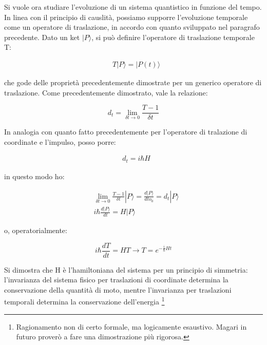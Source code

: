 \documentclass{article}
\begin{document}
Si vuole ora studiare l'evoluzione di un sistema quantistico in funzione del tempo.
In linea con il principio di causlità, possiamo supporre l'evoluzione temporale come un operatore di traslazione, in accordo con quanto sviluppato
nel paragrafo precedente.
Dato un  ket $|P\rangle $, si può definire l'operatore di traslazione temporale T:

\begin{equation}
  \begin{aligned}
     & T |P\rangle = |P(t)\rangle
  \end{aligned}
\end{equation}

che gode delle proprietà precedentemente dimostrate per un generico operatore di traslazione.
Come precedentemente dimostrato, vale la relazione:

\begin{equation}
  d_t= \lim_{\delta t \rightarrow 0} \frac{T-1}{\delta t}
\end{equation}

In analogia con quanto fatto precedentemente per l'operatore di tralazione di coordinate e l'impulso, posso porre:

\begin{equation}
  \begin{aligned}
     & d_t= i\hbar H
  \end{aligned}
\end{equation}

in questo modo ho:

\begin{equation}
  \begin{aligned}
     & \lim_{\delta t \rightarrow 0} \frac{T-1}{\delta t}|P\rangle = \frac{d |P\rangle }{d to_0}= d_t |P\rangle \\
     & i\hbar \frac{d |P\rangle }{dt}= H|P\rangle
  \end{aligned}
\end{equation}

o, operatorialmente:

\begin{equation}
  i\hbar \frac{d T}{dt}= HT \rightarrow T=e^{-\frac{i}{\hbar}Ht}
\end{equation}

Si dimostra che H è l'hamiltoniana del sistema per un principio di simmetria:
l'invarianza del sistema fisico per traslazioni di coordinate determina la conservazione della quantità di moto,
mentre l'invarianza per traslazioni temporali determina la conservazione dell'energia \footnote{
  Ragionamento non di certo formale, ma logicamente esaustivo. Magari in futuro proverò a fare una dimostrazione
  più rigorosa.
}
\end{document}
